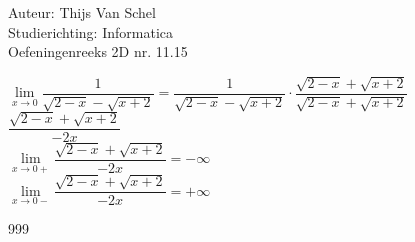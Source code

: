 \documentclass[a4paper]{article}
\begin{document}
  
\noindent \large Auteur: Thijs Van Schel \\
\noindent \large Studierichting: Informatica\\
\noindent \large Oefeningenreeks 2D nr. 11.15\\

\medskip

\normalsize

$\lim\limits_{x\rightarrow 0}\dfrac{1}{\sqrt{2-x}-\sqrt{x+2}} = \dfrac{1}{\sqrt{2-x}-\sqrt{x+2}} \cdot \dfrac{\sqrt{2-x}+\sqrt{x+2}}{\sqrt{2-x}+\sqrt{x+2}}$\\

$\dfrac{\sqrt{2-x}+\sqrt{x+2}}{-2x}$\\

$\lim\limits_{x\rightarrow 0+} \dfrac{\sqrt{2-x}+\sqrt{x+2}}{-2x} = -\infty$\\

$\lim\limits_{x\rightarrow 0-} \dfrac{\sqrt{2-x}+\sqrt{x+2}}{-2x} = +\infty$


\begin{thebibliography}{999}
\end{thebibliography}
\end{document}
